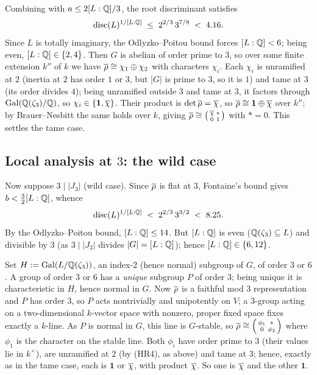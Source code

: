 \documentclass[11pt]{article}
\begin{document}
Combining with $a\leq 2[L:\mathbb{Q}]/3$, the root discriminant satisfies
\[
  \operatorname{disc}(L)^{1/[L:\mathbb{Q}]}\;\leq\;2^{2/3}\,3^{7/8}\;<\;4.16.
\]
Since $L$ is totally imaginary, the Odlyzko--Poitou bound forces $[L:\mathbb{Q}]<6$;
being even, $[L:\mathbb{Q}]\in\{2,4\}$. Then $G$ is abelian of order prime to $3$, so
over some finite extension $k''$ of $k$ we have
$\overline{\rho}\cong\chi_1\oplus\chi_2$ with characters $\chi_i$. Each $\chi_i$ is
unramified at $2$ (inertia at $2$ has order $1$ or $3$, but $|G|$ is prime to
$3$, so it is $1$) and tame at $3$ (its order divides $4$); being unramified
outside $3$ and tame at $3$, it factors through
$\operatorname{Gal}(\mathbb{Q}(\zeta_3)/\mathbb{Q})$, so $\chi_i\in\{\mathbf1,\overline{\chi}\}$. Their product is
$\det\overline{\rho}=\overline{\chi}$, so $\overline{\rho}\cong\mathbf1\oplus\overline{\chi}$ over $k''$; by
Brauer--Nesbitt the same holds over $k$, giving
$\overline{\rho}\cong\left(\begin{smallmatrix}\overline{\chi}&*\\0&1\end{smallmatrix}\right)$
with $*=0$. This settles the tame case.

\subsection*{Local analysis at $3$: the wild case}
Now suppose $3\mid|J_3|$ (wild case). Since $\overline{\rho}$ is flat at $3$,
Fontaine's bound gives $b<\tfrac{3}{2}[L:\mathbb{Q}]$, whence
\[
  \operatorname{disc}(L)^{1/[L:\mathbb{Q}]}\;<\;2^{2/3}\,3^{3/2}\;<\;8.25 .
\]
By the Odlyzko--Poitou bound, $[L:\mathbb{Q}]\leq14$. But $[L:\mathbb{Q}]$ is even
($\mathbb{Q}(\zeta_3)\subseteq L$) and divisible by $3$ (as $3\mid|J_3|$ divides
$|G|=[L:\mathbb{Q}]$); hence $[L:\mathbb{Q}]\in\{6,12\}$.

Set $H:=\operatorname{Gal}(L/\mathbb{Q}(\zeta_3))$, an index-$2$ (hence normal) subgroup of $G$, of
order $3$ or $6$. A group of order $3$ or $6$ has a \emph{unique} subgroup $P$
of order $3$; being unique it is characteristic in $H$, hence normal in $G$.
Now $\overline{\rho}$ is a faithful mod $3$ representation and $P$ has order $3$, so $P$
acts nontrivially and unipotently on $V$; a $3$-group acting on a two-dimensional
$k$-vector space with nonzero, proper fixed space fixes exactly a $k$-line. As
$P$ is normal in $G$, this line is $G$-stable, so
$\overline{\rho}\cong\left(\begin{smallmatrix}\phi_1&*\\0&\phi_2\end{smallmatrix}\right)$
where $\phi_1$ is the character on the stable line. Both $\phi_i$ have order
prime to $3$ (their values lie in $k^\times$), are unramified at $2$ (by (HR4),
as above) and tame at $3$; hence, exactly as in the tame case, each is $\mathbf1$
or $\overline{\chi}$, with product $\overline{\chi}$. So one is $\overline{\chi}$ and the other
$\mathbf1$.
\end{document}
